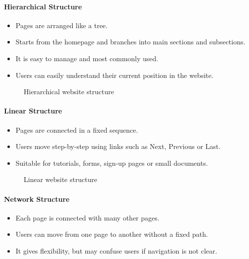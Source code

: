 \paragraph{Hierarchical Structure}

\begin{itemize}
    \item Pages are arranged like a tree.
    \item Starts from the homepage and branches into main sections and subsections.
    \item It is easy to manage and most commonly used.
    \item Users can easily understand their current position in the website.
\end{itemize}

\begin{figure}[H]
    \centering
    \caption{Hierarchical website structure}
    \label{fig:website-structure-hierarchical}
\end{figure}

\paragraph{Linear Structure}

\begin{itemize}
    \item Pages are connected in a fixed sequence.
    \item Users move step-by-step using links such as Next, Previous or Last.
    \item Suitable for tutorials, forms, sign-up pages or small documents.
\end{itemize}

\begin{figure}[H]
    \centering
    \caption{Linear website structure}
    \label{fig:website-structure-linear}
\end{figure}

\paragraph{Network Structure}

\begin{itemize}
    \item Each page is connected with many other pages.
    \item Users can move from one page to another without a fixed path.
    \item It gives flexibility, but may confuse users if navigation is not clear.
\end{itemize}

